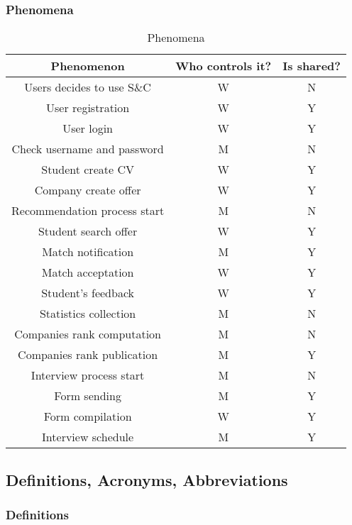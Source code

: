 \subsubsection{Phenomena}
\begin{table}[H]
\renewcommand\arraystretch{1.5}
    \centering
    \begin{tabular}{|ccc|}
        \hline
        \rowcolor{BurntOrange}
        \textbf{Phenomenon}&  \textbf{Who controls it?}& \textbf{Is shared?}\\
        \hline
        Users decides to use S\&C&  W& N\\
        \hline
        User registration&  W& Y\\
        \hline
        User login& W& Y\\
        \hline
        Check username and password&  M& N\\
        \hline
        Student create CV&  W& Y\\
        \hline
        Company create offer&  W& Y\\
        \hline
        Recommendation process start& M& N\\
        \hline
        Student search offer&  W& Y\\
        \hline
        Match notification&  M& Y\\
        \hline
        Match acceptation&  W& Y\\
        \hline
        Student's feedback&  W& Y\\
        \hline
        Statistics collection&  M& N\\
        \hline
        Companies rank computation&  M& N\\
        \hline
        Companies rank publication&  M& Y\\
        \hline
        Interview process start&  M& N\\
        \hline
        Form sending&  M& Y\\
        \hline
        Form compilation&  W& Y\\
        \hline
        Interview schedule&  M& Y\\
        \hline
    \end{tabular}
    \caption{Phenomena}
    \label{Phenomena}
\end{table}
\subsection{Definitions, Acronyms, Abbreviations}
\subsubsection{Definitions}
